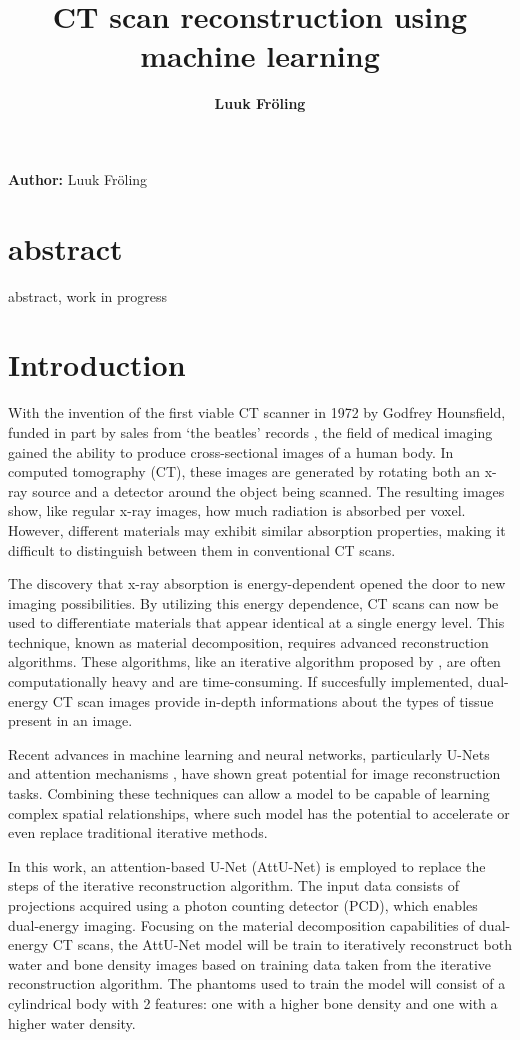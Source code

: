 \documentclass{article}
\title{CT scan reconstruction using machine learning}
\date{\displaydate{articleDate}}
\author{\bfseries Luuk Fröling\mdseries\\}
\begin{document}
\maketitle

\textbf{Author:} Luuk Fröling

\section{abstract}

abstract, work in progress

\section{Introduction}

With the invention of the first viable CT scanner in 1972 by Godfrey Hounsfield, funded in part by sales from `the beatles' records \citep{pietzsch2025ct}, the field of medical imaging gained the ability to produce cross-sectional images of a human body. In computed tomography (CT), these images are generated by rotating both an x-ray source and a detector around the object being scanned. The resulting images show, like regular x-ray images, how much radiation is absorbed per voxel. However, different materials may exhibit similar absorption properties, making it difficult to distinguish between them in conventional CT scans.

The discovery that x-ray absorption is energy-dependent opened the door to new imaging possibilities. By utilizing this energy dependence, CT scans can now be used to differentiate materials that appear identical at a single energy level.  This technique, known as material decomposition, requires advanced reconstruction algorithms. These algorithms, like an iterative algorithm proposed by \citep{mechlem2018joint}, are often computationally heavy and are time-consuming. If succesfully implemented, dual-energy CT scan images provide in-depth informations about the types of tissue present in an image.

Recent advances in machine learning and neural networks, particularly U-Nets \citep{vaswani2017attention} and attention mechanisms \citep{oktay2018attentionunet}, have shown great potential for image reconstruction tasks. Combining these techniques can allow a model to be capable of learning complex spatial relationships, where such model has the potential to accelerate or even replace traditional iterative methods.

In this work, an attention-based U-Net (AttU-Net) is employed to replace the steps of the iterative reconstruction algorithm. The input data consists of projections acquired using a photon counting detector (PCD), which enables dual-energy imaging. Focusing on the material decomposition capabilities of dual-energy CT scans, the AttU-Net model will be train to iteratively reconstruct both water and bone density images based on training data taken from the iterative reconstruction algorithm.
The phantoms used to train the model will consist of a cylindrical body with 2 features: one with a higher bone density and one with a higher water density.
\end{document}
